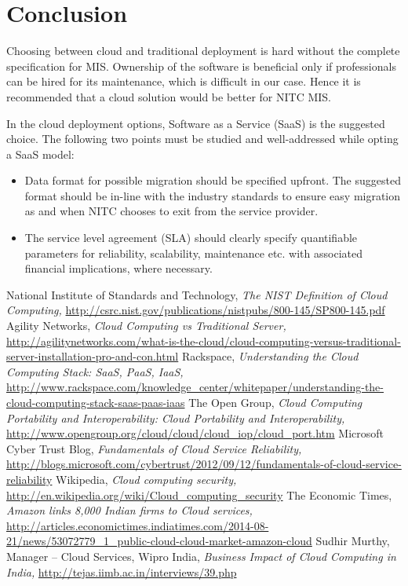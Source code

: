 \documentclass[12pt,a4paper,oneside]{article}
\begin{document}
\newpage
\section{Conclusion}
Choosing between cloud and traditional deployment is hard without the complete
specification for MIS. Ownership of the software is beneficial only if
professionals can be hired for its maintenance, which is difficult in our case.
Hence it is recommended that a cloud solution would be better for NITC MIS.

In the cloud deployment options, Software as a Service (SaaS) is the suggested
choice. The following two points must be studied and well-addressed while opting
a SaaS model:
\begin{itemize}
	\item Data format for possible migration should be specified upfront.
		The suggested format should be in-line with the industry
		standards to ensure easy migration as and when NITC chooses to
		exit from the service provider.
	\item The service level agreement (SLA) should clearly specify
		quantifiable parameters for reliability, scalability,
		maintenance etc. with associated financial implications, where
		necessary.
\end{itemize}

\newpage
\begin{thebibliography}{99}
	National Institute of Standards and Technology,
	\emph{The NIST Definition of Cloud Computing,}
	\url{http://csrc.nist.gov/publications/nistpubs/800-145/SP800-145.pdf}
	Agility Networks,
	\emph{Cloud Computing vs Traditional Server,}
	\url{http://agilitynetworks.com/what-is-the-cloud/cloud-computing-versus-traditional-server-installation-pro-and-con.html}
	Rackspace,
	\emph{Understanding the Cloud Computing Stack: SaaS, PaaS, IaaS,}
	\url{http://www.rackspace.com/knowledge_center/whitepaper/understanding-the-cloud-computing-stack-saas-paas-iaas}
	The Open Group,
	\emph{Cloud Computing Portability and Interoperability: Cloud
		Portability and Interoperability,}
	\url{http://www.opengroup.org/cloud/cloud/cloud_iop/cloud_port.htm}
	Microsoft Cyber Trust Blog,
	\emph{Fundamentals of Cloud Service Reliability,}
	\url{http://blogs.microsoft.com/cybertrust/2012/09/12/fundamentals-of-cloud-service-reliability}
	Wikipedia,
	\emph{Cloud computing security,}
	\url{http://en.wikipedia.org/wiki/Cloud_computing_security}
	The Economic Times,
	\emph{Amazon links 8,000 Indian firms to Cloud services,}
	\url{http://articles.economictimes.indiatimes.com/2014-08-21/news/53072779_1_public-cloud-cloud-market-amazon-cloud}
	Sudhir Murthy, Manager -- Cloud Services, Wipro India,
	\emph{Business Impact of Cloud Computing in India,}
	\url{http://tejas.iimb.ac.in/interviews/39.php}
\end{thebibliography}
\end{document}
